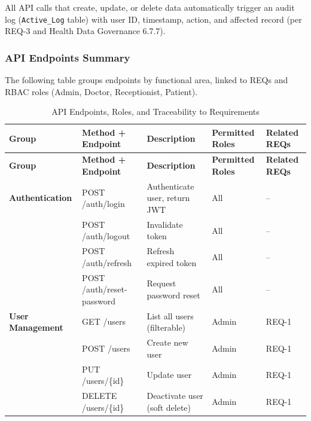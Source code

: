 All API calls that create, update, or delete data automatically trigger an audit log (\texttt{Active\_Log} table) with user ID, timestamp, action, and affected record (per REQ-3 and Health Data Governance 6.7.7).

\subsubsection{API Endpoints Summary}

The following table groups endpoints by functional area, linked to REQs and RBAC roles (Admin, Doctor, Receptionist, Patient).

\begin{longtable}{%
		p{}
		p{}
		p{}
		p{}
		p{}}
	
	\caption{API Endpoints, Roles, and Traceability to Requirements}
	\label{tab:api-endpoints} \\
	
	\toprule
	\textbf{Group} & \textbf{Method + Endpoint} & \textbf{Description} & \textbf{Permitted Roles} & \textbf{Related REQs} \\
	\midrule
	\endfirsthead
	
	\toprule
	\textbf{Group} & \textbf{Method + Endpoint} & \textbf{Description} & \textbf{Permitted Roles} & \textbf{Related REQs} \\
	\midrule
	\endhead
	
	\textbf{Authentication}
	& POST /auth/login          & Authenticate user, return JWT     & All & -- \\[8pt]
	& POST /auth/logout         & Invalidate token                  & All & -- \\[8pt]
	& POST /auth/refresh        & Refresh expired token             & All & -- \\[8pt]
	& POST /auth/reset-password & Request password reset            & All & -- \\[10pt]
	
	\textbf{User Management}
	& GET /users                & List all users (filterable)       & Admin & REQ-1 \\[8pt]
	& POST /users               & Create new user                   & Admin & REQ-1 \\[8pt]
	& PUT /users/\{id\}         & Update user                       & Admin & REQ-1 \\[8pt]
	& DELETE /users/\{id\}      & Deactivate user (soft delete)     & Admin & REQ-1 \\[10pt]
	

\end{longtable}
